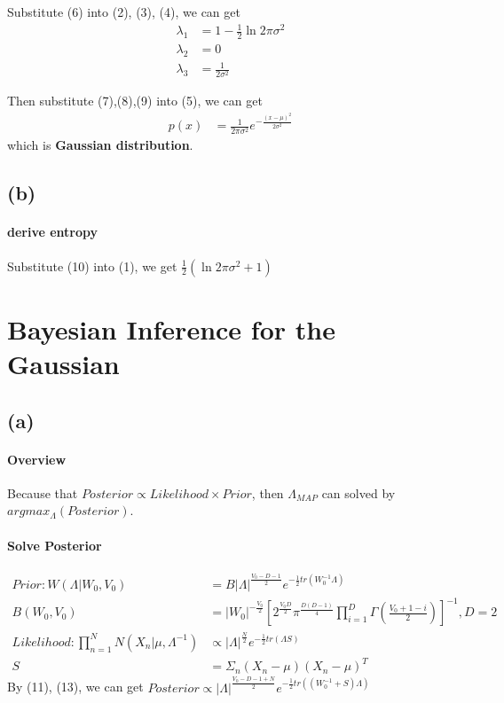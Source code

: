 \documentclass[]{article}
\begin{document}
						
						Substitute (6) into (2), (3), (4), we can get 
						\begin{align}
						\lambda_{1} &= 1 - \frac{1}{2} \ln{2\pi \sigma^{2}}\\
						\lambda_{2} &= 0\\
						\lambda_{3} &= \frac{1}{2\sigma^{2}}  
						\end{align}
						
						Then substitute (7),(8),(9) into (5), we can get
						\begin{align}
						p(x) &= \frac{1}{2\pi\sigma^{2}}e^{-\frac{(x-\mu)^{2}}{2\sigma^{2}}}
						\end{align}
						which is \textbf{Gaussian distribution}.
		\subsection*{(b)}
				\paragraph*{derive entropy}
				Substitute (10) into (1), we get $\frac{1}{2}(\ln{2\pi\sigma^{2}}+1)$
						\section{Bayesian Inference for the Gaussian}
						\subsection*{(a)}
							\paragraph*{Overview}
								Because that $Posterior \propto Likelihood \times Prior$, then $\Lambda_{MAP}$ can solved by $argmax_{\Lambda}(Posterior)$.													\paragraph*{Solve Posterior}
								\begin{align}
								Prior:W(\Lambda|W_{0},V_{0}) &= B|\Lambda|^{\frac{V_{0}-D-1}{2}}e^{-\frac{1}{2}tr(W_{0}^{-1}\Lambda)}\\
								B(W_{0},V_{0}) &= |W_{0}|^{-\frac{V_{0}}{2}}[2^{\frac{V_{0}D}{2}}\pi^{\frac{D(D-1)}{4}}\prod_{i=1}^{D}\Gamma(\frac{V_{0}+1-i}{2})]^{-1}, D=2\\
								Likelihood:\prod_{n=1}^{N}N(X_{n}|\mu,\Lambda^{-1}) &\propto |\Lambda|^{\frac{N}{2}}e^{-\frac{1}{2}tr(\Lambda S)}\\
								S &= \Sigma_{n}(X_{n}-\mu)(X_{n}-\mu)^{T}
								\end{align}
								By (11), (13), we can get $Posterior \propto |\Lambda|^{\frac{V_{0}-D-1+N}{2}}e^{-\frac{1}{2}tr((W_{0}^{-1}+S)\Lambda)}$				
\end{document}
